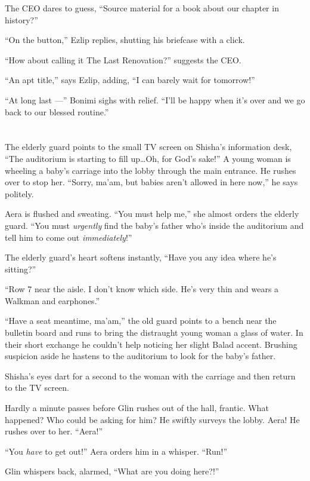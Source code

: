 \documentclass[twoside,11pt,openany]{book}
\begin{document}
The CEO dares to guess, ``Source material for a book about our chapter in history?''

``On the button,'' Ezlip replies, shutting his briefcase with a click.

``How about calling it The Last Renovation?'' suggests the CEO.

``An apt title,'' says Ezlip, adding, ``I can barely wait for
tomorrow!''

``At long last ---'' Bonimi sighs with relief. ``I'll be happy when it's over and
we go back to our blessed routine.''


\chapter{}

The elderly guard points to the small TV screen on Shisha's information desk, ``The auditorium is starting
to fill up{\ldots}Oh, for God's sake!'' A young woman is wheeling a baby's carriage into the lobby
through the main entrance. He rushes over to stop her. ``Sorry,
ma'am, but babies aren't allowed in here now,'' he says politely.

Aera is flushed and sweating. ``You must help me,'' she almost orders the elderly guard.
``You must \textit{urgently} find the baby's father who's inside the auditorium and tell him to come out
\textit{immediately}!''

The elderly guard's heart softens instantly, ``Have you any idea where he's sitting?''

``Row 7 near the aisle. I don't know which side. He's very thin and wears a Walkman and
earphones.''

``Have a seat meantime, ma'am,'' the old guard points to a bench near the bulletin board and runs to bring
the distraught young woman a glass of water. In their short exchange he couldn't help noticing her slight Balad accent.
Brushing suspicion aside he hastens to the auditorium to look for the baby's father.

Shisha's eyes dart for a second to the woman with{ }the carriage and then
return to the TV screen.

Hardly a minute passes before Glin rushes out of the hall, frantic. What happened? Who could be asking for him? He
swiftly surveys the lobby. Aera! He rushes over to her. ``Aera!''

``You \textit{have} to get out!'' Aera orders him in a whisper.
``Run!''

Glin whispers back, alarmed{, }{}``What are you doing here?!''
\end{document}
